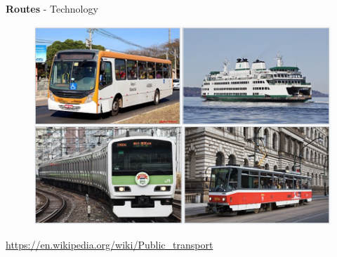 \documentclass[aspectratio=169]{beamer}
\begin{document}
\begin{frame}
	
	\textbf{Routes} - Technology 
	
	\begin{figure}
		\centering
		\includegraphics[width=0.76\linewidth]{images/wiki_transit.png}
	\end{figure}
	
	\tiny \url{https://en.wikipedia.org/wiki/Public_transport}
	
\end{frame}
\end{document}
